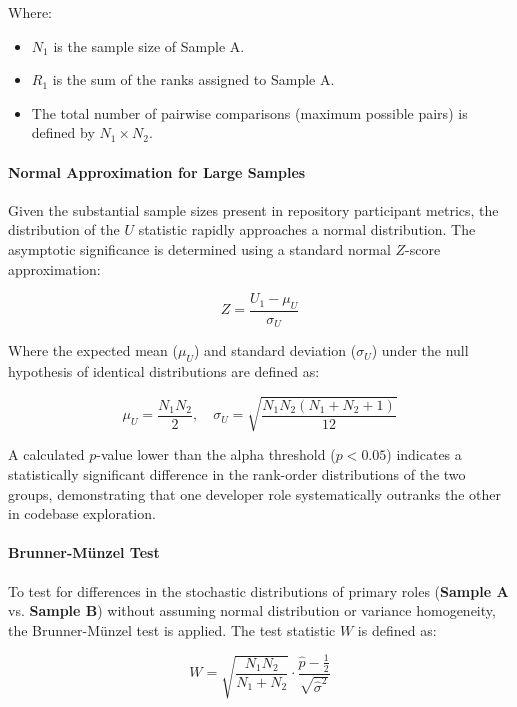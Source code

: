 Where:
\begin{itemize}
    \item $N_1$ is the sample size of Sample A.
    \item $R_1$ is the sum of the ranks assigned to Sample A.
    \item The total number of pairwise comparisons (maximum possible pairs) is defined by $N_1 \times N_2$.
\end{itemize}

\paragraph{Normal Approximation for Large Samples}
Given the substantial sample sizes present in repository participant metrics, the distribution of the $U$ statistic rapidly approaches a normal distribution. The asymptotic significance is determined using a standard normal $Z$-score approximation:

\begin{equation}
    Z = \frac{U_1 - \mu_U}{\sigma_U}
\end{equation}

Where the expected mean ($\mu_U$) and standard deviation ($\sigma_U$) under the null hypothesis of identical distributions are defined as:

\begin{equation}
    \mu_U = \frac{N_1 N_2}{2}, \quad \sigma_U = \sqrt{\frac{N_1 N_2 (N_1 + N_2 + 1)}{12}}
    \label{eq:mwu_normal}
\end{equation}

A calculated $p$-value lower than the alpha threshold ($p < 0.05$) indicates a statistically significant difference in the rank-order distributions of the two groups, demonstrating that one developer role systematically outranks the other in codebase exploration.


\paragraph{Brunner-Münzel Test}
To test for differences in the stochastic distributions of primary roles (\textbf{Sample A} vs. \textbf{Sample B}) without assuming normal distribution or variance homogeneity, the Brunner-Münzel test is applied. The test statistic $W$ is defined as:

\begin{equation}
    W = \sqrt{\frac{N_1 N_2}{N_1 + N_2}} \cdot \frac{\hat{p} - \frac{1}{2}}{\sqrt{\hat{\sigma}^2}}
\end{equation}

